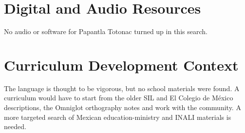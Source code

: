 \documentclass[12pt]{article}
\begin{document}
\section{Digital and Audio Resources}
No audio or software for Papantla Totonac turned up in this search.

\section{Curriculum Development Context}
The language is thought to be vigorous, but no school materials were found. A curriculum would have to start from the older SIL and El Colegio de M\'exico descriptions, the Omniglot orthography notes and work with the community. A more targeted search of Mexican education-ministry and INALI materials is needed.
\end{document}
